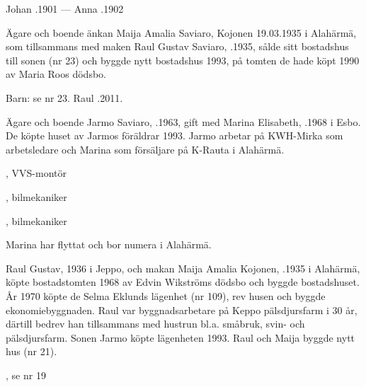 Johan .1901  ---  Anna .1902






Ägare och boende änkan Maija Amalia Saviaro, \textborn Kojonen 19.03.1935 i Alahärmä, som tillsammans med maken Raul Gustav Saviaro, .1935, sålde sitt bostadshus till sonen (nr 23) och byggde nytt bostadshus 1993, på tomten de hade köpt 1990 av Maria Roos dödsbo.

Barn: se nr 23. Raul .2011.






Ägare och boende Jarmo Saviaro, .1963, gift med Marina Elisabeth, .1968 i Esbo. De köpte huset av Jarmos föräldrar 1993. Jarmo arbetar på KWH-Mirka som arbetsledare och Marina som försäljare på K-Rauta i Alahärmä.
\begin{jhchildren}
  \item {}, VVS-montör
  \item {}, bilmekaniker
  \item {}, bilmekaniker
\end{jhchildren}
Marina har flyttat och bor numera i Alahärmä.


Raul Gustav,  1936 i Jeppo, och makan Maija Amalia Kojonen, .1935 i Alahärmä, köpte bostadstomten 1968 av Edvin Wikströms dödsbo och byggde bostadshuset. År 1970 köpte de Selma Eklunds lägenhet (nr 109), rev husen och byggde ekonomiebyggnaden. Raul var byggnadsarbetare på Keppo pälsdjursfarm i 30 år, därtill bedrev han tillsammans med hustrun bl.a. småbruk, svin- och pälsdjursfarm. Sonen Jarmo köpte lägenheten 1993. Raul och Maija byggde nytt hus (nr 21).
\begin{jhchildren}
  \item {}, se nr 19
  \item {}
\end{jhchildren}



